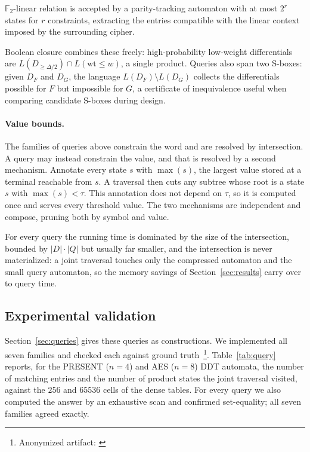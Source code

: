\documentclass[runningheads]{llncs}
\newcommand{\F}{\mathbb{F}}
\newcommand{\wt}{\mathrm{wt}}
\begin{document}
\begin{description}
  $\F_2$-linear relation is accepted by a parity-tracking automaton with at most
  $2^{r}$ states for $r$ constraints, extracting the entries compatible with the
  linear context imposed by the surrounding cipher.
\item[Composite and comparative queries.] Boolean closure combines these freely:
  high-probability low-weight differentials are
  $L(D_{\ge\Delta/2})\cap L(\wt\le w)$, a single product. Queries also span two
  S-boxes: given $D_F$ and $D_G$, the language $L(D_F)\setminus L(D_G)$ collects
  the differentials possible for $F$ but impossible for $G$, a certificate of
  inequivalence useful when comparing candidate S-boxes during design.
\end{description}

\paragraph{Value bounds.}
The families of queries above constrain the word and are resolved by intersection. A query may instead constrain the value, and that is resolved by a second mechanism. Annotate every state $s$ with $\max(s)$, the largest value stored at a terminal reachable from $s$. A traversal then cuts any subtree whose root is a state $s$ with $\max(s)<\tau$. This annotation does not depend on $\tau$, so it is computed once and serves every threshold value. The two mechanisms are independent and compose, pruning both by symbol and value.

For every query the running time is dominated by the size of the intersection,
bounded by $|D|\cdot|Q|$ but usually far smaller, and the intersection is never
materialized: a joint traversal touches only the compressed automaton and the
small query automaton, so the memory savings of Section~\ref{sec:results} carry
over to query time.

\subsection{Experimental validation}
\label{sec:query-exp}

Section~\ref{sec:queries} gives these queries as constructions. We implemented all seven families and checked each against ground truth~\footnote{Anonymized artifact: \url{}}. Table~\ref{tab:query} reports, for the
PRESENT ($n=4$) and AES ($n=8$) DDT automata, the number of matching entries and
the number of product states the joint traversal visited, against the $256$ and
$65536$ cells of the dense tables. For every query we also computed the answer by
an exhaustive scan and confirmed set-equality; all seven families agreed exactly.
\end{document}
